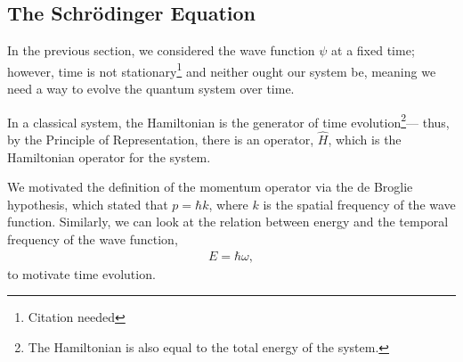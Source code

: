 \documentclass[12pt]{extarticle}
\theoremstyle{plain}
\theoremstyle{definition}
\theoremstyle{remark}
\renewcommand{\newline}{\hfill\break}
\begin{document}
  \subsection{The Schrödinger Equation}%
  In the previous section, we considered the wave function $\psi$ at a fixed time; however, time is not stationary\footnote{Citation needed} and neither ought our system be, meaning we need a way to evolve the quantum system over time.\newline

  In a classical system, the Hamiltonian is the generator of time evolution\footnote{The Hamiltonian is also equal to the total energy of the system.}--- thus, by the Principle of Representation, there is an operator, $\hat{H}$, which is the Hamiltonian operator for the system.\newline

  We motivated the definition of the momentum operator via the de Broglie hypothesis, which stated that $p = \hbar k$, where $k$ is the spatial frequency of the wave function. Similarly, we can look at the relation between energy and the temporal frequency of the wave function,
  \begin{align*}
    E = \hbar \omega,
  \end{align*}
  to motivate time evolution.\newline
\end{document}
